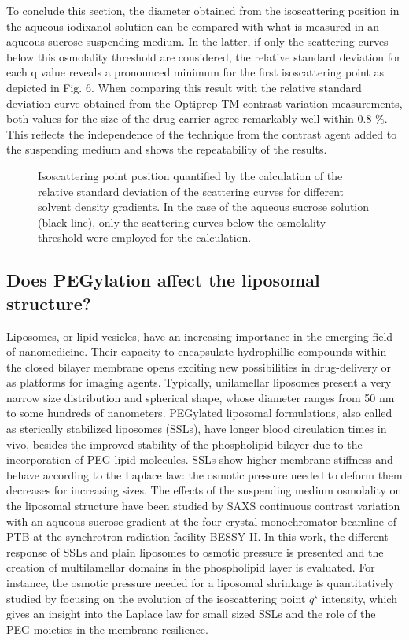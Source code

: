 To conclude this section, the diameter obtained from the isoscattering position in the aqueous iodixanol solution can be compared with what is measured in an aqueous sucrose suspending medium.  In the latter, if only the scattering curves below this osmolality threshold are considered, the relative standard deviation for each q value reveals a pronounced minimum for the first isoscattering point as depicted in Fig. 6. When comparing this result with the relative standard deviation curve obtained from the Optiprep TM contrast variation measurements, both values for the size of the drug carrier agree remarkably well within 0.8 $\%$. This reflects the independence of the technique from the contrast agent added to the suspending medium and shows the repeatability of the results.

\begin{figure}
	\centering
		
		\caption{Isoscattering point position quantified by the calculation of the relative standard deviation of the scattering curves for different solvent density gradients. In the case of the aqueous sucrose solution (black line), only the scattering curves below the osmolality threshold were employed for the calculation.}
		\label{fig:CaelyxIsopointComparison}
\end{figure}

\subsection{Does PEGylation affect the liposomal structure?}

Liposomes, or lipid vesicles, have an increasing importance in the emerging field of nanomedicine. Their capacity to encapsulate hydrophillic compounds within the closed bilayer membrane opens exciting new possibilities in drug-delivery or as platforms for imaging agents. Typically, unilamellar liposomes present a very narrow size distribution and spherical shape, whose diameter ranges from 50 nm to some hundreds of nanometers. PEGylated liposomal formulations, also called as sterically stabilized liposomes (SSLs), have longer blood circulation times in vivo, besides the improved stability of the phospholipid bilayer due to the incorporation of PEG-lipid molecules. SSLs show higher membrane stiffness and behave according to the Laplace law: the osmotic pressure needed to deform them decreases for increasing sizes. The effects of the suspending medium osmolality on the liposomal structure have been studied by SAXS continuous contrast variation with an aqueous sucrose gradient at the four-crystal monochromator beamline of PTB at the synchrotron radiation facility BESSY II. In this work, the different response of SSLs and plain liposomes to osmotic pressure is presented and the creation of multilamellar domains in the phospholipid layer is evaluated. For instance, the osmotic pressure needed for a liposomal shrinkage is quantitatively studied by focusing on the evolution of the isoscattering point $q^{\star}$ intensity, which gives an insight into the Laplace law for small sized SSLs and the role of the PEG moieties in the membrane resilience.

